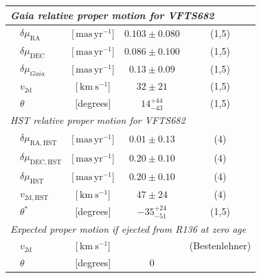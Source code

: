 \documentclass[apjl,twocolumn]{emulateapj}
\newcommand{\SdM}[1]{{{\color{brown}{#1}}}}
\newcommand{\kms}{{\,\mathrm{km\ s^{-1}}}}
\newcommand{\masyr}{\,\mathrm{mas}\,\mathrm{yr}^{-1}}
\begin{document}
\begin{table}
\begin{center}
\begin{tabular}{llc|c|c}
                


      \multicolumn{5}{l}{\emph{Gaia relative proper motion for VFTS682 }} \\
      \hline
      &$\delta\mu_\mathrm{RA}$  &[$\masyr$] & $0.103\pm0.080$ & (1,5) \\
      &$\delta\mu_\mathrm{DEC}$  &[$\masyr$] & $0.086\pm0.100$ &  (1,5) \\
      &$\delta\mu_{Gaia}$  &[$\masyr$] & $0.13\pm0.09$ &  (1,5) \\
      &$v_\mathrm{2d}$  &[$\kms$] & $32\pm21$ & (1,5)\\  
      &$\theta$  &[degrees] &  $14_{-43}^{+44}$  & (1,5)\\  

 \hline     
      \multicolumn{5}{l}{\emph{HST relative proper motion for VFTS682}} \\
            \hline
      &$\delta\mu_\mathrm{RA, HST}$  &[$\masyr$] & $0.01\pm0.13$ & (4) \\
      &$\delta\mu_\mathrm{DEC, HST}$  &[$\masyr$] & $0.20\pm0.10$ &  (4) \\
       &$\delta\mu_\mathrm{HST}$  &[$\masyr$] & $0.20\pm0.10$ &  (4) \\
                  &$v_\mathrm{2d, HST}$  &[$\kms$] & $47\pm24$ & (4)\\  
                      &$\theta^{*}$  &[degrees] &   $-35_{-51}^{+24}$   & (1,5)\\  
    \hline
       \multicolumn{5}{l}{\emph{Expected proper motion if ejected from R136 at zero age}} \\
      \hline
      &$v_\mathrm{2d}$  &[$\kms$] & \SdM{$xx\pm xx$} & (Bestenlehner) \\  
      &$\theta$  &[degrees] &  $0$  & \\ 
       \hline

     
\hline


      \hline


\end{tabular}
\end{center}
\end{table}
\end{document}
